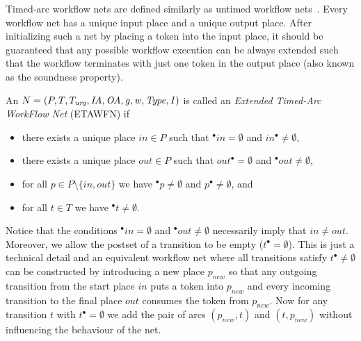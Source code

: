 Timed-arc workflow nets are defined similarly as untimed 
workflow nets~\cite{Aalst97}. Every workflow net has a unique
input place and a unique output place. After initializing such a 
net by placing a token into the input place, it should be
guaranteed that any possible workflow execution can be always 
extended such that the workflow terminates with just one token
in the output place (also known as the soundness property).


\begin{definition} \label{defetawfn}
An  $N=(P, T, T_{\mathit{urg}}, \mathit{IA},\allowbreak \mathit{OA}, \mathit{g}, \mathit{w}, \mathit{Type}, \mathit{I})$ is called an 
\emph{Extended Timed-Arc WorkFlow Net} (ETAWFN) 
if
\begin{itemize}
\item there exists a unique place $in \in P$ such that $^\bullet in= \emptyset$ and $in^\bullet \neq \emptyset$,
\item there exists a unique place $out \in P$ such that $out^\bullet=\emptyset$ and $^\bullet out \neq \emptyset$,
\item for all $p \in P \setminus \{in,out\}$ we have $^\bullet p \neq \emptyset$ and $p^\bullet \neq \emptyset$, and
\item for all $t \in T$ we have $^\bullet t \neq \emptyset.$
\end{itemize} 
\end{definition}

\begin{remark}
Notice that the conditions $^\bullet in= \emptyset$ and
$^\bullet out \neq \emptyset$ necessarily imply that $in \not= out$.
Moreover, we allow the postset of a transition to be empty 
($t^\bullet=\emptyset$). This is just a technical detail and
an equivalent workflow net where all transitions satisfy
$t^\bullet \not= \emptyset$ can be constructed
by introducing a new place $p_\mathit{new}$ so that any outgoing transition
from the start place $in$ puts a token into $p_\mathit{new}$ and every
incoming transition to the final place $out$  consumes the token
from $p_\mathit{new}$. Now for any transition $t$ with 
$t^\bullet=\emptyset$ we add the pair of arcs $(p_\mathit{new},t)$
and $(t,p_\mathit{new})$ without influencing the behaviour of the net.
\end{remark}

